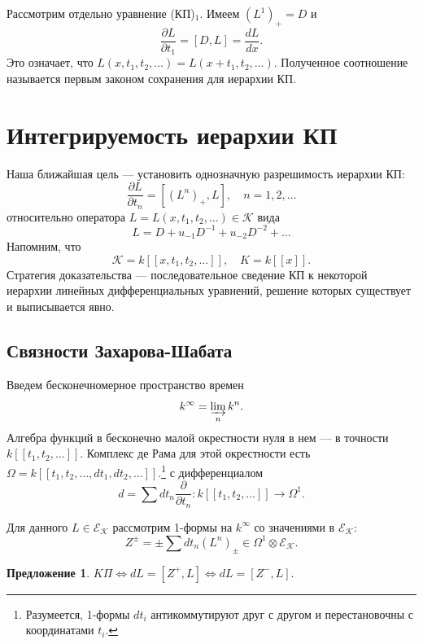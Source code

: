 \documentclass{article}
\theoremstyle{definition}
\theoremstyle{definition} %
\theoremstyle{remark}     %
\theoremstyle{definition}
\theoremstyle{definition}
\theoremstyle{definition}
\theoremstyle{definition}
\theoremstyle{definition}
\newtheorem{proposition}[theorem]{Предложение}
\theoremstyle{definition}
\theoremstyle{definition}
\theoremstyle{definition}
\begin{document}
Рассмотрим отдельно уравнение (КП)\(_1\). Имеем \((L^1)_+ = D\) и
\[
\frac{\partial L}{\partial t_1} = [D, L] = \frac{dL}{dx}.
\]
Это означает, что \(L(x, t_1, t_2, \dots) = L(x + t_1, t_2, \dots)\). Полученное соотношение называется первым законом сохранения для иерархии КП.












\newpage


\section{Интегрируемость иерархии КП}

Наша ближайшая цель — установить однозначную разрешимость иерархии КП:
\[
\frac{\partial L}{\partial t_n} = [(L^n)_+, L], \quad n = 1, 2, \dots
\]
относительно оператора \(L = L(x, t_1, t_2, \dots) \in \mathcal{K}\) вида
\[
L = D + u_{-1}D^{-1} + u_{-2}D^{-2} + \dots
\]
Напомним, что
\[
\mathcal{K} = k[[x, t_1, t_2, \dots]], \quad K = k[[x]].
\]
Стратегия доказательства — последовательное сведение КП к некоторой иерархии линейных дифференциальных уравнений, решение которых существует и выписывается явно.




\subsection{Связности Захарова-Шабата}



Введем бесконечномерное пространство времен
\[
k^\infty = \varinjlim_n k^n.
\]
Алгебра функций в бесконечно малой окрестности нуля в нем — в точности \( k[[t_1, t_2, \dots]]. \) Комплекс де Рама для этой окрестности есть
\(\Omega = k[[t_1, t_2, \dots, dt_1, dt_2, \dots]].\)\footnote{Разумеется, 1-формы \( dt_i \) антикоммутируют друг с другом и перестановочны с координатами \( t_i \).} с дифференциалом
\[
d = \sum dt_n \frac{\partial}{\partial t_n} : k[[t_1, t_2, \dots]] \to \Omega^1.
\]

Для данного \( L \in \mathcal{E}_\mathcal{K} \) рассмотрим 1-формы на \( k^\infty \) со значениями в \( \mathcal{E}_\mathcal{K} \):
\[
Z^{\pm} = \pm \sum dt_n (L^n)_{\pm} \in \Omega^1 \otimes \mathcal{E}_\mathcal{K}.
\]

\begin{proposition}
\( K\Pi \iff dL = [Z^+, L] \iff dL = [Z^-, L]. \)
\end{proposition}
\end{document}

